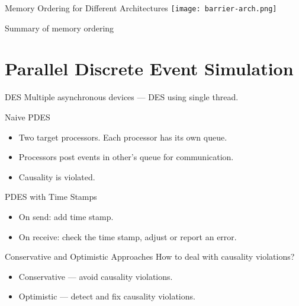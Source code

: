 \begin{frame}{Memory Ordering for Different Architectures}
  \centering
  \texttt{[image: barrier-arch.png]}

  \tiny{Summary of memory ordering~\cite{mckenney-memory-barriers}}
\end{frame}

\section{Parallel Discrete Event Simulation}

\begin{frame}{DES}
  Multiple asynchronous devices --- DES using single thread.
  \vfill
  \centering
\end{frame}

\begin{frame}{Naive PDES}
  \begin{itemize}
    \item Two target processors. Each processor has its own queue.
    \item Processors post events in other's queue for communication. \pause
    \item Causality is violated.
  \end{itemize}
  \centering
\end{frame}

\begin{frame}{PDES with Time Stamps}
  \begin{itemize}
    \item On send: add time stamp.
    \item On receive: check the time stamp, adjust or report an error.
  \end{itemize}
  \centering
\end{frame}

\begin{frame}{Conservative and Optimistic Approaches}
  How to deal with causality violations?
  \begin{itemize}
    \item Conservative --- avoid causality violations.
    \item Optimistic --- detect and fix causality violations.
  \end{itemize}
\end{frame}

